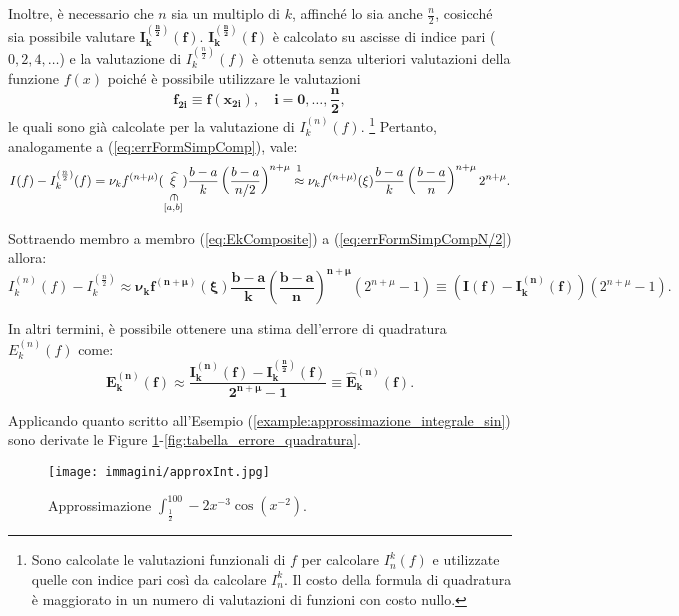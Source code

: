 Inoltre, è necessario che $n$ sia un multiplo di $k$, affinché lo sia anche $\frac{n}{2}$, cosicché sia possibile valutare $\boldsymbol{I_k^{(\frac{n}{2})}(f)}$. $\boldsymbol{I_k^{(\frac{n}{2})}(f)}$ è calcolato su ascisse di indice pari ($0,2,4,\hdots$) e la valutazione di $I_k^{(\frac{n}{2})}(f)$ è ottenuta senza ulteriori valutazioni della funzione $f(x)$ poiché è possibile utilizzare le valutazioni
\begin{equation*}
    \boldsymbol{f_{2i}\equiv f(x_{2i}),\quad i=0,\hdots,\frac{n}{2}},
\end{equation*}
le quali sono già calcolate per la valutazione di $I_k^{(n)}(f)$. \footnote{Sono calcolate le valutazioni funzionali di $f$ per calcolare $I_n^k(f)$ e utilizzate quelle con indice pari così da calcolare $I_n^k$. Il costo della formula di quadratura è maggiorato in un numero di valutazioni di funzioni con costo nullo.} Pertanto, analogamente a (\ref{eq:errFormSimpComp}), vale:
\begin{equation}\label{eq:errFormSimpCompN/2}
    I(f)-I_k^{(\frac{n}{2})}(f)=\nu_k f^{(n+\mu)}(\into{\widehat\xi}{[a,b]})\frac{b-a}{k}\left(\frac{b-a}{n/2}\right)^{n+\mu}\overset{\footnotemark}{\approx}\nu_k f^{(n+\mu)}(\xi)\frac{b-a}{k}\left(\frac{b-a}{n}\right)^{n+\mu}2^{n+\mu}.
\end{equation}

Sottraendo membro a membro (\ref{eq:EkComposite}) a (\ref{eq:errFormSimpCompN/2}) allora:
\begin{equation*}
    I_k^{(n)}(f)-I_k^{(\frac{n}{2})}\approx\boldsymbol{\nu_kf^{(n+\mu)}(\xi)\frac{b-a}{k}\left(\frac{b-a}{n}\right)^{n+\mu}}(2^{n+\mu}-1)\equiv \left(\boldsymbol{I(f)-I_k^{(n)}(f)}\right)(2^{n+\mu}-1).
\end{equation*}

In altri termini, è possibile ottenere una stima dell'errore di quadratura $E_k^{(n)}(f)$ come:
\begin{equation*}
    \boldsymbol{E_k^{(n)}(f)\approx\frac{I_k^{(n)}(f)-I_k^{(\frac{n}{2})}(f)}{2^{n+\mu}-1}\equiv\widehat E_k^{(n)}(f)}.
\end{equation*}

Applicando quanto scritto all'Esempio (\ref{example:approssimazione_integrale_sin}) sono derivate le Figure \ref{fig:approssimazione_integrale}-\ref{fig:tabella_errore_quadratura}.

\begin{figure}
    \centering
    \texttt{[image: immagini/approxInt.jpg]}
    \caption{Approssimazione $\int_{\frac{1}{2}}^{100}-2x^{-3}\cos(x^{-2})$.}\label{fig:approssimazione_integrale}
\end{figure}


